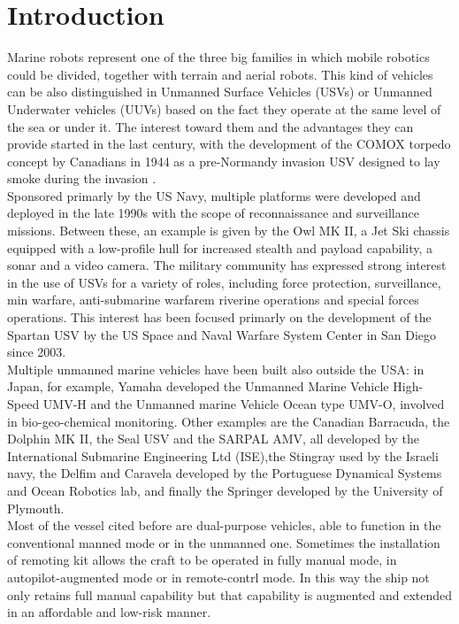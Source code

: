 \documentclass[journal]{IEEEtran}
\begin{document}
\section{Introduction} \label{introduction}
Marine robots represent one of the three big families in which mobile robotics could be divided, together with terrain and aerial robots. This kind of vehicles can be also distinguished in Unmanned Surface Vehicles (USVs) or Unmanned Underwater vehicles (UUVs) based on the fact they operate at the same level of the sea or under it.
The interest toward them and the advantages they can provide started in the last century, with the development of the COMOX torpedo concept by Canadians in 1944 as a pre-Normandy invasion USV designed to lay smoke during the invasion \cite{Bertram2008}.\\
\indent Sponsored primarly by the US Navy, multiple platforms were developed and deployed in the late 1990s with the scope of reconnaissance and surveillance missions. Between these, an example is given by the Owl MK II, a Jet Ski chassis equipped with a low-profile hull for increased stealth and payload capability, a sonar and a video camera. The military community has expressed strong interest in the use of USVs for a variety of roles, including force protection, surveillance, min warfare, anti-submarine warfarem riverine operations and special forces operations. This interest has been focused primarly on the development of the Spartan USV by the US Space and Naval Warfare System Center in San Diego since 2003. \\
\indent Multiple unmanned marine vehicles have been built also outside the USA: in Japan, for example, Yamaha developed the Unmanned Marine Vehicle High-Speed UMV-H and the Unmanned marine Vehicle Ocean type UMV-O, involved in bio-geo-chemical monitoring. Other examples are the Canadian Barracuda, the Dolphin MK II, the Seal USV and the SARPAL AMV, all developed by the International Submarine Engineering Ltd (ISE),the Stingray used by the Israeli navy, the Delfim and Caravela developed by the Portuguese Dynamical Systems and Ocean Robotics lab, and finally the Springer developed by the University of Plymouth.\\
\indent Most of the vessel cited before are dual-purpose vehicles, able to function in the conventional manned mode or in the unmanned one. Sometimes the installation of remoting kit allows the craft to be operated in fully manual mode, in autopilot-augmented mode or in remote-contrl mode. In this way the ship not only retains full manual capability but that capability is augmented and extended in an affordable and low-risk manner.\\
\end{document}
